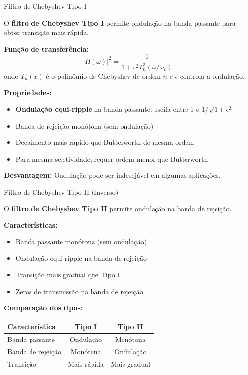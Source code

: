 \begin{frame}{Filtro de Chebyshev Tipo I}

O \textbf{filtro de Chebyshev Tipo I} permite ondulação na banda passante para obter transição mais rápida.

\textbf{Função de transferência:}
\[
|H(\omega)|^2 = \frac{1}{1 + \epsilon^2 T_n^2(\omega/\omega_c)}
\]
onde $T_n(x)$ é o polinômio de Chebyshev de ordem $n$ e $\epsilon$ controla a ondulação.

\textbf{Propriedades:}
\begin{itemize}
\item \textbf{Ondulação equi-ripple} na banda passante: oscila entre 1 e $1/\sqrt{1+\epsilon^2}$
\item Banda de rejeição monótona (sem ondulação)
\item Decaimento mais rápido que Butterworth de mesma ordem
\item Para mesma seletividade, requer ordem menor que Butterworth
\end{itemize}

\textbf{Desvantagem:} Ondulação pode ser indesejável em algumas aplicações.

\end{frame}


\begin{frame}{Filtro de Chebyshev Tipo II (Inverso)}

O \textbf{filtro de Chebyshev Tipo II} permite ondulação na banda de rejeição.

\textbf{Características:}

\begin{itemize}
\item Banda passante monótona (sem ondulação)
\item Ondulação equi-ripple na banda de rejeição
\item Transição mais gradual que Tipo I
\item Zeros de transmissão na banda de rejeição
\end{itemize}

\vspace{0.2cm}

\textbf{Comparação dos tipos:}

\begin{center}
\small
\begin{tabular}{|l|c|c|}
\hline
\textbf{Característica} & \textbf{Tipo I} & \textbf{Tipo II} \\
\hline
Banda passante & Ondulação & Monótona \\
\hline
Banda de rejeição & Monótona & Ondulação \\
\hline
Transição & Mais rápida & Mais gradual \\
\hline
\end{tabular}
\end{center}

\end{frame}

